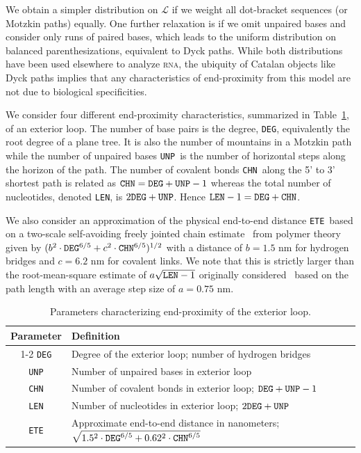 \documentclass{article}
\newcommand{\RNA}{\textsc{rna}}
\newcommand{\DEG}{{\tt DEG}}
\newcommand{\UNP}{{\tt UNP}}
\newcommand{\ETE}{{\tt ETE}}
\newcommand{\COV}{{\tt CHN}}
\newcommand{\LEN}{{\tt LEN}}
\begin{document}
We obtain a simpler distribution on $\mathcal{L}$ if we
weight all dot-bracket sequences (or Motzkin paths) equally.
One further relaxation is if we omit unpaired bases and consider only runs of paired bases, which leads to the uniform distribution on balanced parenthesizations, equivalent to Dyck paths.  While both distributions have been used elsewhere to analyze \RNA, the ubiquity of Catalan objects like Dyck paths implies that any characteristics of end-proximity from this model are not due to biological specificities.

We consider four different end-proximity characteristics, 
summarized in Table~\ref{table:Parameters}, of an exterior loop.
The number of base pairs is the degree, \DEG,
equivalently the root degree of a plane tree.  
It is also the number of mountains in a Motzkin path while
the number of unpaired bases \UNP\ is the 
number of horizontal steps along the horizon of the path.
The number of covalent bonds \COV\ along the 5' to 3' shortest path is 
related as $\COV = \DEG + \UNP - 1$ whereas the total number of nucleotides,
denoted \LEN, is $2\DEG + \UNP$.
Hence $\LEN - 1 = \DEG + \COV$.

We also consider an approximation of the physical end-to-end distance \ETE\
based on a two-scale self-avoiding freely jointed chain 
estimate~\cite{Aalberts:2010, Lai:2018} 
from polymer theory given by 
$(b^2 \cdot \DEG^{6/5} + c^2 \cdot \COV^{6/5})^{1/2}$
with a distance of $b = 1.5$ nm for hydrogen bridges 
and $c = 6.2$ nm for covalent links.
We note that this is strictly larger than the root-mean-square estimate
of $a \sqrt{\LEN - 1}$ originally considered~\cite{Yoffe:2010}
based on the path length with an average step size of $a = 0.75$ nm.

\begin{table}[h]
\centering
\begin{tabular}{cl}
\toprule
Parameter & Definition\\
\cmidrule(l){1-2}
\DEG & Degree of the exterior loop; number of hydrogen bridges \\
\UNP & Number of unpaired bases in exterior loop\\
\COV & Number of covalent bonds in exterior loop; $\DEG + \UNP - 1$\\
\LEN & Number of nucleotides in exterior loop; $2\DEG + \UNP$\\
\ETE & Approximate end-to-end distance in nanometers; $\sqrt{1.5^2 \cdot \DEG^{6/5} + 0.62^2 \cdot \COV^{6/5}}$\\
\bottomrule
\end{tabular}
\caption{Parameters characterizing end-proximity of the exterior loop.}
\label{table:Parameters}
\end{table}
\end{document}
